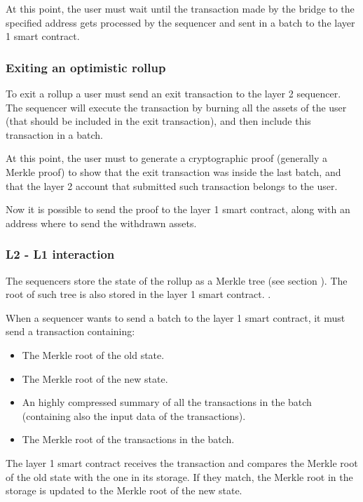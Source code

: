 \documentclass[11pt]{article}
\begin{document}
At this point, the user must wait until the transaction made by the bridge to the specified address gets processed by the sequencer and sent in a batch to the layer 1 smart contract.

\subsubsection{Exiting an optimistic rollup} \label{subsubsection:exiting_optimistic_rollup}
To exit a rollup a user must send an exit transaction to the layer 2 sequencer. The sequencer will execute the transaction by burning all the assets of the user (that should be included in the exit transaction), and then include this transaction in a batch.

At this point, the user must to generate a cryptographic proof (generally a Merkle proof) to show that the exit transaction was inside the last batch, and that the layer 2 account that submitted such transaction belongs to the user.

Now it is possible to send the proof to the layer 1 smart contract, along with an address where to send the withdrawn assets.

\subsubsection{L2 - L1 interaction} \label{subsubsection:l2l1i}
The sequencers store the state of the rollup as a Merkle tree (see section ). The root of such tree is also stored in the layer 1 smart contract. \cite{optimistic_rollups}.

When a sequencer wants to send a batch to the layer 1 smart contract, it must send a transaction containing:
\begin{itemize}
    \item The Merkle root of the old state.
    \item The Merkle root of the new state.
    \item An highly compressed summary of all the transactions in the batch (containing also the input data of the transactions).
    \item The Merkle root of the transactions in the batch.
\end{itemize}

The layer 1 smart contract receives the transaction and compares the Merkle root of the old state with the one in its storage. If they match, the Merkle root in the storage is updated to the Merkle root of the new state.
\end{document}
